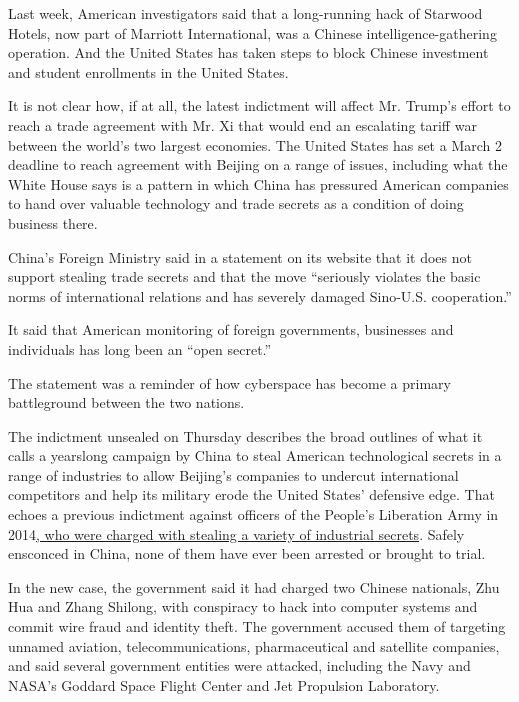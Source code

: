 Last week, American investigators said that a long-running hack of
Starwood Hotels, now part of Marriott International, was a Chinese
intelligence-gathering operation. And the United States has taken steps
to block Chinese investment and student enrollments in the United
States.

It is not clear how, if at all, the latest indictment will affect Mr.
Trump's effort to reach a trade agreement with Mr. Xi that would end an
escalating tariff war between the world's two largest economies. The
United States has set a March 2 deadline to reach agreement with Beijing
on a range of issues, including what the White House says is a pattern
in which China has pressured American companies to hand over valuable
technology and trade secrets as a condition of doing business there.

China's Foreign Ministry said in a statement on its website that it does
not support stealing trade secrets and that the move ``seriously
violates the basic norms of international relations and has severely
damaged Sino-U.S. cooperation.''

It said that American monitoring of foreign governments, businesses and
individuals has long been an ``open secret.''

The statement was a reminder of how cyberspace has become a primary
battleground between the two nations.

The indictment unsealed on Thursday describes the broad outlines of what
it calls a yearslong campaign by China to steal American technological
secrets in a range of industries to allow Beijing's companies to
undercut international competitors and help its military erode the
United States' defensive edge. That echoes a previous indictment against
officers of the People's Liberation Army in
2014\href{https://www.nytimes.com/2014/05/20/us/us-to-charge-chinese-workers-with-cyberspying.html}{,
who were charged with stealing a variety of industrial secrets}. Safely
ensconced in China, none of them have ever been arrested or brought to
trial.

In the new case, the government said it had charged two Chinese
nationals, Zhu Hua and Zhang Shilong, with conspiracy to hack into
computer systems and commit wire fraud and identity theft. The
government accused them of targeting unnamed aviation,
telecommunications, pharmaceutical and satellite companies, and said
several government entities were attacked, including the Navy and NASA's
Goddard Space Flight Center and Jet Propulsion Laboratory.

